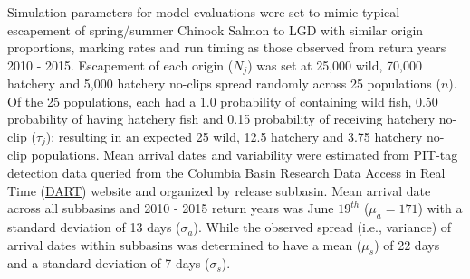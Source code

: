 \documentclass[
  12pt,
]{article}
\begin{document}
Simulation parameters for model evaluations were set to mimic typical escapement of spring/summer Chinook Salmon to LGD with similar origin proportions, marking rates and run timing as those observed from return years 2010 - 2015. Escapement of each origin (\(N_j\)) was set at 25,000 wild, 70,000 hatchery and 5,000 hatchery no-clips spread randomly across 25 populations (\(n\)). Of the 25 populations, each had a 1.0 probability of containing wild fish, 0.50 probability of having hatchery fish and 0.15 probability of receiving hatchery no-clip (\(\tau_j\)); resulting in an expected 25 wild, 12.5 hatchery and 3.75 hatchery no-clip populations. Mean arrival dates and variability were estimated from PIT-tag detection data queried from the Columbia Basin Research Data Access in Real Time (\href{http://www.cbr.washington.edu/dart/query/pit_adult_window}{DART}) website and organized by release subbasin. Mean arrival date across all subbasins and 2010 - 2015 return years was June \(19^{th}\) (\(\mu_a = 171\)) with a standard deviation of 13 days (\(\sigma_a\)). While the observed spread (i.e., variance) of arrival dates within subbasins was determined to have a mean (\(\mu_s\)) of 22 days and a standard deviation of 7 days (\(\sigma_s\)).
\end{document}
